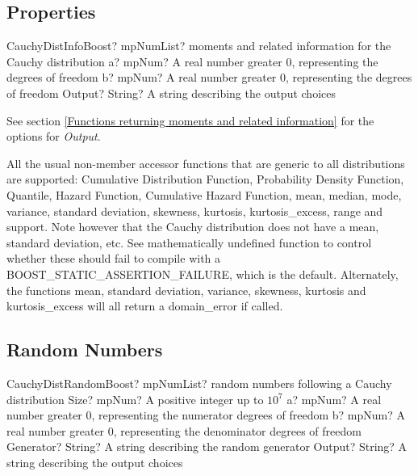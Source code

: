 \subsection{Properties}
\label{CauchyDistributionProperties}


\begin{mpFunctionsExtract}
	\mpFunctionThreeNotImplemented
	{CauchyDistInfoBoost? mpNumList? moments and related information for the Cauchy distribution}
	{a? mpNum? A real number greater 0, representing the degrees of freedom}
	{b? mpNum? A real number greater 0, representing the degrees of freedom}
	{Output? String? A string describing the output choices}
\end{mpFunctionsExtract}

\vspace{0.3cm}

See section \ref{Functions returning moments and related information} for the options for {\itshape\sffamily Output}. 

All the usual non-member accessor functions that are generic to all distributions are supported: Cumulative Distribution Function,
Probability Density Function, Quantile, Hazard Function, Cumulative Hazard Function, mean, median, mode, variance, standard
deviation, skewness, kurtosis, kurtosis\_excess, range and support.
Note however that the Cauchy distribution does not have a mean, standard deviation, etc. See mathematically undefined function  to
control whether these should fail to compile with a BOOST\_STATIC\_ASSERTION\_FAILURE, which is the default.
Alternately, the functions mean, standard deviation, variance, skewness, kurtosis and kurtosis\_excess will all return a domain\_error
if called.



\subsection{Random Numbers}
\begin{mpFunctionsExtract}
	\mpFunctionFiveNotImplemented
	{CauchyDistRandomBoost? mpNumList? random numbers following a Cauchy distribution}
	{Size? mpNum? A positive integer up to $10^7$}
	{a? mpNum? A real number greater 0, representing the numerator  degrees of freedom}
	{b? mpNum? A real number greater 0, representing the denominator degrees of freedom}
	{Generator? String? A string describing the random generator}
	{Output? String? A string describing the output choices}
\end{mpFunctionsExtract}

